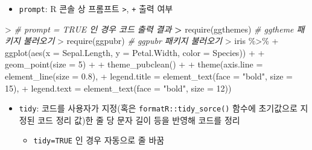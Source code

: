 \documentclass[
  11pt,
]{krantz}
\newenvironment{Shaded}{\begin{snugshade}}{\end{snugshade}}
\newcommand{\AttributeTok}[1]{\textcolor[rgb]{0.61,0.61,0.61}{#1}}
\newcommand{\CommentTok}[1]{\textcolor[rgb]{0.37,0.37,0.37}{\textit{#1}}}
\newcommand{\DecValTok}[1]{\textcolor[rgb]{0.06,0.06,0.06}{#1}}
\newcommand{\ErrorTok}[1]{\textcolor[rgb]{0.14,0.14,0.14}{\textbf{#1}}}
\newcommand{\FloatTok}[1]{\textcolor[rgb]{0.06,0.06,0.06}{#1}}
\newcommand{\FunctionTok}[1]{\textcolor[rgb]{0,0,0}{#1}}
\newcommand{\NormalTok}[1]{#1}
\newcommand{\SpecialCharTok}[1]{\textcolor[rgb]{0,0,0}{#1}}
\newcommand{\StringTok}[1]{\textcolor[rgb]{0.5,0.5,0.5}{#1}}
\providecommand{\tightlist}{%
  \setlength{\itemsep}{0pt}\setlength{\parskip}{0pt}}
\begin{document}
\normalsize

\begin{itemize}
\tightlist
\item
  \texttt{prompt}: R 콘솔 상 프롬프트 \texttt{\textgreater{}}, \texttt{+} 출력 여부
\end{itemize}

\footnotesize

\begin{Shaded}
\begin{Highlighting}[]
\SpecialCharTok{\textgreater{}} \CommentTok{\# prompt = TRUE 인 경우 코드 출력 결과}
\ErrorTok{\textgreater{}} \FunctionTok{require}\NormalTok{(ggthemes) }\CommentTok{\# ggtheme 패키지 불러오기}
\SpecialCharTok{\textgreater{}} \FunctionTok{require}\NormalTok{(ggpubr) }\CommentTok{\# ggpubr 패키지 불러오기}
\SpecialCharTok{\textgreater{}}\NormalTok{ iris }\SpecialCharTok{\%\textgreater{}\%}
\SpecialCharTok{+}    \FunctionTok{ggplot}\NormalTok{(}\FunctionTok{aes}\NormalTok{(}\AttributeTok{x =}\NormalTok{ Sepal.Length, }\AttributeTok{y =}\NormalTok{ Petal.Width, }\AttributeTok{color =}\NormalTok{ Species)) }\SpecialCharTok{+}
\SpecialCharTok{+}    \FunctionTok{geom\_point}\NormalTok{(}\AttributeTok{size =} \DecValTok{5}\NormalTok{) }\SpecialCharTok{+}
\SpecialCharTok{+}    \FunctionTok{theme\_pubclean}\NormalTok{() }\SpecialCharTok{+}
\SpecialCharTok{+}    \FunctionTok{theme}\NormalTok{(}\AttributeTok{axis.line =} \FunctionTok{element\_line}\NormalTok{(}\AttributeTok{size =} \FloatTok{0.8}\NormalTok{),}
\SpecialCharTok{+}          \AttributeTok{legend.title =} \FunctionTok{element\_text}\NormalTok{(}\AttributeTok{face =} \StringTok{"bold"}\NormalTok{, }\AttributeTok{size =} \DecValTok{15}\NormalTok{),}
\SpecialCharTok{+}          \AttributeTok{legend.text =} \FunctionTok{element\_text}\NormalTok{(}\AttributeTok{face =} \StringTok{"bold"}\NormalTok{, }\AttributeTok{size =} \DecValTok{12}\NormalTok{))}
\end{Highlighting}
\end{Shaded}

\normalsize

\begin{itemize}
\tightlist
\item
  \texttt{tidy}: 코드를 사용자가 지정(혹은 \texttt{formatR::tidy\_sorce()} 함수에 초기값으로 지정된 코드 정리 값)한 줄 당 문자 길이 등을 반영해 코드를 정리

  \begin{itemize}
  \tightlist
  \item
    \texttt{tidy=TRUE} 인 경우 자동으로 줄 바꿈
  \end{itemize}
\end{itemize}
\end{document}
